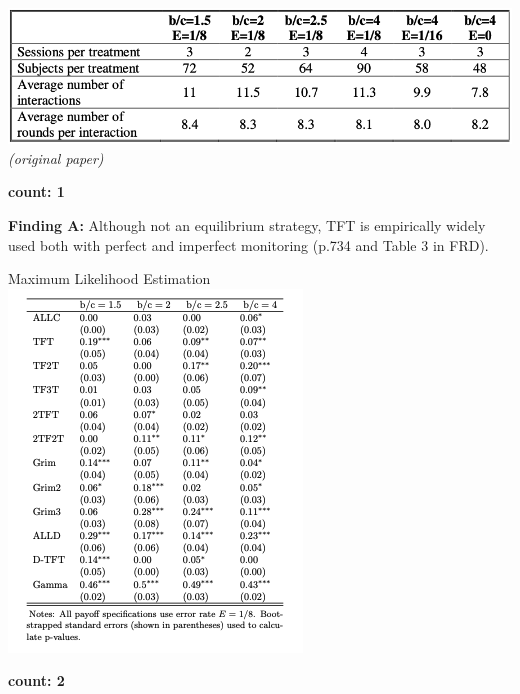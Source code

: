 \documentclass{beamer}
\begin{document}
\begin{frame}
    \centering
    \includegraphics[width=.85\textwidth]{static/setup} \\
    \hspace{6cm} \textit{(original paper)} \vspace{2cm}

    \pause
    \hspace{6cm} \textbf{count: 1}
\end{frame}

\begin{frame}
    \centering
    \textbf{Finding A:} Although not an equilibrium strategy, TFT is empirically
    widely used both with perfect and imperfect monitoring (p.734 and Table 3 in
    FRD).
\end{frame}

\begin{frame}
    \centering
    Maximum Likelihood Estimation \\\vspace{.5cm}
    \includegraphics[width=.45\textwidth]{static/result A.png}
    \vspace{1cm}

    \pause
    \hspace{6cm} \textbf{count: 2}
\end{frame}
\end{document}
